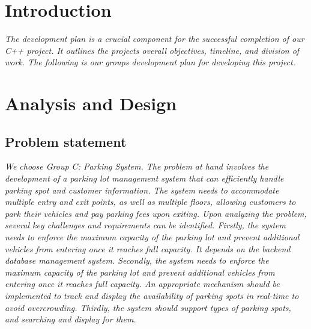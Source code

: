 \pagestyle{fancy}
\fancyhead[L]{}
\renewcommand{\headrulewidth}{2pt}
\renewcommand{\baselinestretch}{1.5}
\setcounter{page}{2} 
{\rmfamily\selectfont
\vspace{-1ex}
	\section{Introduction}
	{\slshape \selectfont 
		The development plan is a crucial component for the successful
		completion of our C++ project. It outlines the project\textquotesingle s
		overall objectives, timeline, and division of work. The following is our
		group\textquotesingle s development plan for developing this project.
		
	}
	
		
	\section{Analysis and Design}
	{
		\subsection{Problem statement}
		{\slshape \selectfont
			We choose Group C: Parking System. The problem at hand involves the development of a parking lot
			management system that can efficiently handle parking spot and customer information. The system
			needs to accommodate multiple entry and exit points, as well as multiple floors, allowing customers to
			park their vehicles and pay parking fees upon exiting.
			Upon analyzing the problem, several key challenges and requirements can be identified. Firstly,
			the system needs to enforce the maximum capacity of the parking lot and prevent additional vehicles
			from entering once it reaches full capacity. It depends on the backend database management system.
			Secondly, the system needs to enforce the maximum capacity of the parking lot and prevent additional
			vehicles from entering once it reaches full capacity. An appropriate mechanism should be implemented
			to track and display the availability of parking spots in real-time to avoid overcrowding. Thirdly, the
			system should support types of parking spots, and searching and display for them.
				
}}}
